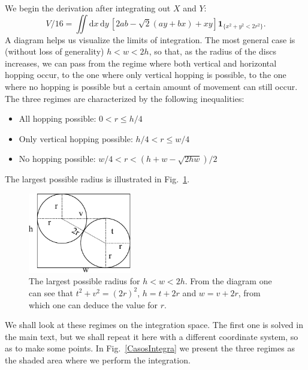 \documentclass[superscriptaddress,pre,reprint,showpacs,onecolumn]{revtex4-1}
\newcommand{\rd}[1]{\mathrm{d}{#1} \,}
\newcommand{\indicatorsymbol}{\mathbf{1}}
\newcommand{\indicator}[1]{\indicatorsymbol_{ \{   #1 \} } }
\begin{document}
We begin the derivation after integrating out $X$ and $Y$:
\begin{equation}\label{VolumenGeneral}
V/16 =\iint \rd x \rd y \left[ 2ab-\sqrt{2}(ay+bx)+x y \right]
\indicator{x^2+y^2 < 2r^2 }.
\end{equation}
A diagram helps us visualize the limits of integration. The most general
case is (without loss of generality) $h < w < 2h$, so that, as the radius of the
discs increases, we can pass from the regime where both vertical and horizontal
hopping occur, to the one where only vertical hopping
is possible, to the one where no hopping is possible but a certain amount of movement
can still occur. The three regimes are characterized by the following inequalities:
\begin{itemize}
\item All hopping possible: $0<r \leq h/4$
\item Only vertical hopping possible: $h/4 < r \leq w/4$
\item No hopping possible: $w/4 < r < (h+w-\sqrt{2hw})/2$
\end{itemize}
The largest possible radius is illustrated in Fig.~\ref{radiomaximo}.

\begin{figure}[h]
  \centering
  \includegraphics[width=0.4\textwidth]{FigurasPerfectas/DiagramaRadioMaximo.pdf}
  \caption{The largest possible radius for $h<w<2h$. From the diagram
    one can see that $t^2+v^2=(2r)^2$, $h=t+2r$ and $w=v+2r$, from which
    one can deduce the value for $r$.}
  \label{radiomaximo}
\end{figure}

We shall look at these regimes on the integration space. The first one is solved
in the main text, but we shall repeat it here with a different coordinate system, so as to
make some points. In Fig.~\ref{CasosIntegra} we present the three regimes as
the shaded area where we perform the integration. 
  
\end{document}
